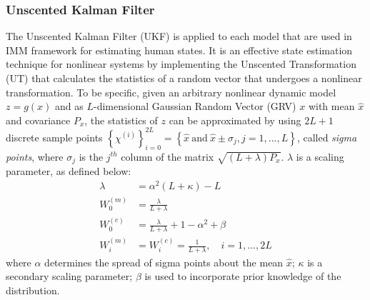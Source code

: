 \documentclass[letterpaper, 10 pt, conference]{ieeeconf}
\begin{document}
	\subsubsection{Unscented Kalman Filter}\label{subsec:UKF}
	The Unscented Kalman Filter (UKF) is applied to each model that are used in IMM framework for estimating human states. 
	It is an effective state estimation technique for nonlinear systems by implementing the Unscented Transformation (UT) that calculates the statistics of a random vector that undergoes a nonlinear transformation\cite {haykin2004kalman}.
	To be specific, given an arbitrary nonlinear dynamic model $z=g(x)$ and as $L$-dimensional Gaussian Random Vector (GRV) $x$ with mean $\hat{x}$ and covariance $P_x$, the statistics of $z$ can be approximated by using $2L+1$ discrete sample points $\left\{\chi^{(i)} \right\}_{i=0}^{2L}=\left\{ \hat{x}\ \text{and}\  \hat{x} \pm \sigma_j, j=1,...,L\right \}$, called \textit{sigma points}, where $\sigma_j$ is the $j^{th}$ column of the matrix $\sqrt{(L+\lambda)P_x}$. $\lambda$ is a scaling parameter, as defined below:
	\begin{subequations}
		\begin{align}
			\lambda&=\alpha^2(L+\kappa)-L  \label{eqn:ukf}\\
			W_0^{(m)}&=\frac{\lambda}{L+\lambda}\\
			W_0^{(c)}&=\frac{\lambda}{L+\lambda}+1-\alpha^2+\beta\\
			W_i^{(m)}&=W_i^{(c)}=\frac{1}{L+\lambda},\quad i=1,...,2L 
		\end{align}
	\end{subequations}
	where $\alpha$ determines the spread of sigma points about the mean $\hat{x}$; $\kappa$ is a secondary scaling parameter; $\beta$ is used to incorporate prior knowledge of the distribution.	
	
\end{document}
